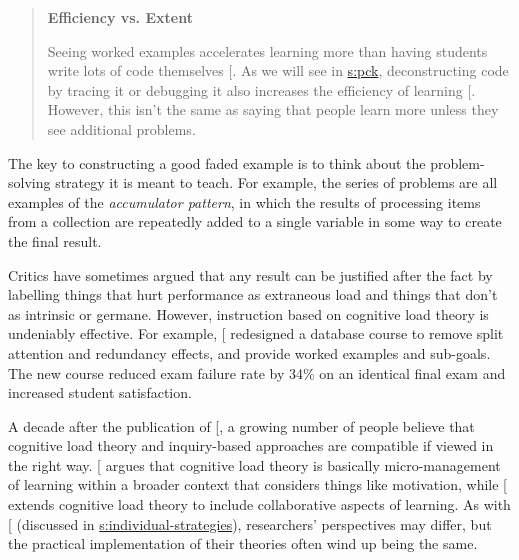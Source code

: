\begin{quote}\setlength{\parindent}{0pt}
\textbf{Efficiency vs. Extent}

Seeing worked examples accelerates learning more than having students
write lots of code themselves {[}\protect[\hyperlink{b:Skud2014}{Skud2014}]{]}. As we will see in
\protect\hyperlink{CHAPTER}{s:pck}, deconstructing code by tracing it or debugging it
also increases the efficiency of learning {[}\protect[\hyperlink{b:Grif2016}{Grif2016}]{]}. However,
this isn't the same as saying that people learn more unless they see
additional problems.
\end{quote}

The key to constructing a good faded example is to think about the
problem-solving strategy it is meant to teach. For example, the series
of problems are all examples of the \emph{accumulator pattern}, in which the
results of processing items from a collection are repeatedly added to a
single variable in some way to create the final result.

Critics have sometimes argued that any result can be justified after the
fact by labelling things that hurt performance as extraneous load and
things that don't as intrinsic or germane. However, instruction based on
cognitive load theory is undeniably effective. For example,
{[}\protect[\hyperlink{b:Maso2016}{Maso2016}]{]} redesigned a database course to remove split
attention and redundancy effects, and provide worked examples and
sub-goals. The new course reduced exam failure rate by 34\% on an
identical final exam and increased student satisfaction.

A decade after the publication of {[}\protect[\hyperlink{b:Kirs2006}{Kirs2006}]{]}, a growing number
of people believe that cognitive load theory and inquiry-based
approaches are compatible if viewed in the right way. {[}\protect[\hyperlink{b:Kaly2015}{Kaly2015}]{]}
argues that cognitive load theory is basically micro-management of
learning within a broader context that considers things like motivation,
while {[}\protect[\hyperlink{b:Kirs2018}{Kirs2018}]{]} extends cognitive load theory to include
collaborative aspects of learning. As with {[}\protect[\hyperlink{b:Mark2018}{Mark2018}]{]} (discussed
in \protect\hyperlink{SECTION}{s:individual-strategies}), researchers' perspectives may
differ, but the practical implementation of their theories often wind up
being the same.

